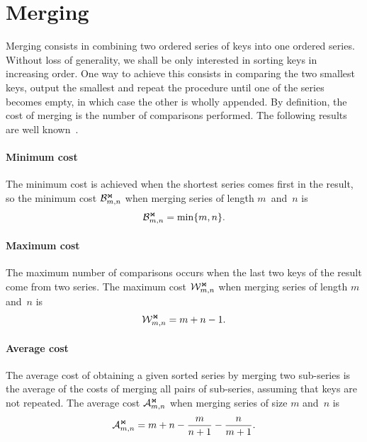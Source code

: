 \section{Merging}

Merging consists in combining two ordered series of keys into one
ordered series. Without loss of generality, we shall be only
interested in sorting keys in increasing order. One way to achieve
this consists in comparing the two smallest keys, output the smallest
and repeat the procedure until one of the series becomes empty, in
which case the other is wholly appended. By definition, the cost of
merging is the number of comparisons performed. The following
results are well known~\cite{Knuth:1998}.

\paragraph{Minimum cost}
\label{merge:best_case}

The minimum cost is achieved when the shortest series comes first in
the result, so the minimum cost \(\mathcal{B}_{m,n}^{\Join}\) when merging series
of length \(m\)~and~\(n\) is
\begin{equation}
\mathcal{B}_{m,n}^{\Join} = \min\{m,n\}.\label{eq:best_merge}
\end{equation}

\paragraph{Maximum cost}

The maximum number of comparisons occurs when the last two keys of the
result come from two series. The maximum cost \(\mathcal{W}_{m,n}^{\Join}\) when
merging series of length \(m\) and~\(n\) is
\begin{equation}
\mathcal{W}_{m,n}^{\Join} = m + n - 1.\label{eq:worst_merge}
\end{equation}

\paragraph{Average cost}

The average cost of obtaining a given sorted series by merging two
sub-series is the average of the costs of merging all pairs of
sub-series, assuming that keys are not repeated. The average cost
\(\mathcal{A}_{m,n}^{\Join}\) when merging series of size \(m\) and~\(n\) is
\begin{equation}
\mathcal{A}_{m,n}^{\Join} = m + n - \frac{m}{n+1} - \frac{n}{m+1}.
\label{eq:mean_merge}
\end{equation}

